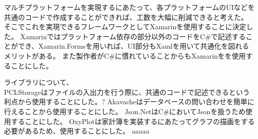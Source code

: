 ﻿\documentclass{jsarticle}
\begin{document}
       	マルチプラットフォームを実現するにあたって、各プラットフォームのUIなどを共通のコードで作成することができれば、工数を大幅に削減できると考えた。
        そこでこれを実現できるフレームワークとしてXamarinを使用することに決定した。
        Xamarinではプラットフォーム依存の部分以外のコードをC\#で記述することができ、Xamarin.Formsを用いれば、UI部分もXamlを用いて共通化を図れるメリットがある。
        また製作者がC\#に慣れていることからもXamarinをを使用することにした。
        
        ライブラリについて、\\
        PCLStorageはファイルの入出力を行う際に、共通のコードで記述できるという利点から使用することにした。?
        Akavacheはデータベースの問い合わせを簡単に行えることから使用することにした。
        Json.NetはC\#においてJsonを扱うため使用することにした。
        OxyPlotは家計簿を実装するにあたってグラフの描画をする必要があるため、使用することにした。
    aaaaa
\end{document}
